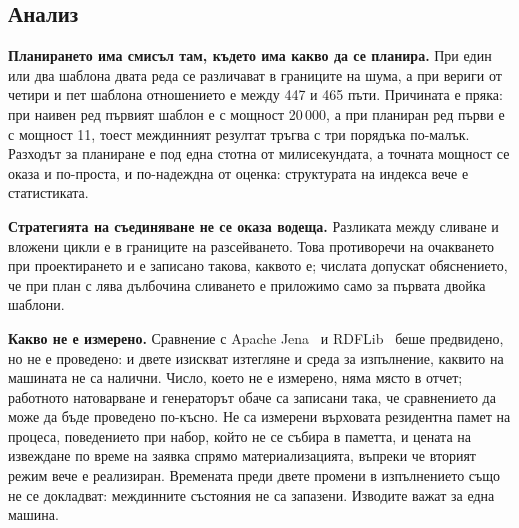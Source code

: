 \subsection{Анализ}

\textbf{Планирането има смисъл там, където има какво да се планира.} При един или два шаблона
двата реда се различават в границите на шума, а при вериги от четири и пет шаблона отношението
е между 447 и 465 пъти. Причината е пряка: при наивен ред първият шаблон е
 с мощност 20\,000, а при планиран ред първи е
 с мощност 11, тоест междинният резултат тръгва с три порядъка
по-малък. Разходът за планиране е под една стотна от милисекундата, а точната мощност се оказа
и по-проста, и по-надеждна от оценка: структурата на индекса вече е статистиката.

\textbf{Стратегията на съединяване не се оказа водеща.} Разликата между сливане и вложени цикли
е в границите на разсейването. Това противоречи на очакването при проектирането и е записано
такова, каквото е; числата допускат обяснението, че при план с лява дълбочина сливането е
приложимо само за първата двойка шаблони.

\textbf{Какво не е измерено.} Сравнение с Apache Jena~\cite{jena_docs} и
RDFLib~\cite{rdflib_docs} беше предвидено, но не е проведено: и двете изискват изтегляне и среда
за изпълнение, каквито на машината не са налични. Число, което не е измерено, няма място в
отчет; работното натоварване и генераторът обаче са записани така, че сравнението да може да
бъде проведено по-късно. Не са измерени върховата резидентна памет на процеса, поведението
при набор, който не се събира в паметта, и цената на извеждане по време на заявка спрямо
материализацията, въпреки че вторият режим вече е реализиран. Времената преди двете промени в
изпълнението също не се докладват: междинните състояния не са запазени. Изводите важат за една
машина.
